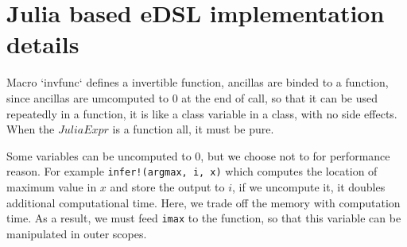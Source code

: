 \documentclass[aps,twocolumn,longbibliography,english,superscriptaddress,prr]{revtex4-1}
\newcommand{\<}{\langle}
\renewcommand{\>}{\rangle}
\theoremstyle{definition}\newtheorem{definition}{\textit{Definition}}
\begin{document}
\section{Julia based eDSL implementation details}

Macro `invfunc` defines a invertible function, ancillas are binded to a function, since ancillas are umcomputed to $0$ at the end of call, so that it can be used repeatedly in a function, it is like a class variable in a class, with no side effects. When the $JuliaExpr$ is a function all, it must be pure.

Some variables can be uncomputed to $0$, but we choose not to for performance reason. For example
\texttt{infer!(argmax, i, x)} which computes the location of maximum value in $x$ and store the output to $i$, if we uncompute it, it doubles additional computational time. Here, we trade off the memory with computation time. As a result, we must feed \texttt{imax} to the function, so that this variable can be manipulated in outer scopes.

\end{document}

